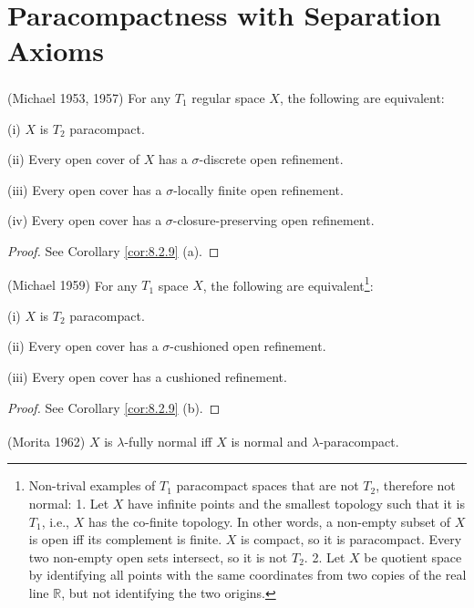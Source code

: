 \documentclass[ch2.tex]{subfiles}
\begin{document}
	\section{Paracompactness with Separation Axioms}  
	\label{sec:2.2}


 {\theorem{} \label{th:2.2.1}
\textup{(\hstretch{1.8}{[}Michael 1953, 1957\hstretch{1.8}{]}\textsuperscript{\cite{Michael1953}\cite{Michael1957}})}
For any $T_1$ regular space $X$, the following are equivalent:

\textup{(i)} $X$ is $T_2$ paracompact.

\textup{(ii)}  Every open cover of $X$ has a $\sigma$-discrete open refinement.

\textup{(iii)} Every open cover has a $\sigma$-locally finite open refinement.

\textup{(iv)}  Every open cover has a $\sigma$-closure-preserving open refinement.
}
\begin{proof}
See Corollary \ref{cor:8.2.9} (a).
\end{proof}

{\theorem{}  \label{th:2.2.2}
\textup{(\hstretch{1.8}{[}Michael 1959\hstretch{1.8}{]}\textsuperscript{\cite{Michael1959}})} 
For any $T_1$ space $X$, the following are equivalent\footnote{Non-trival examples of $T_1$ 
	paracompact spaces that are not $T_2$, therefore not normal:
	1. Let $X$ have infinite points and the smallest topology such that it is $T_1$, i.e., $X$ has the
	co-finite topology. In other words, a non-empty subset of $X$
	is open iff its complement is finite. $X$ is compact, so it is paracompact. Every two non-empty open sets intersect, so it is not $T_2$. 
	2. Let $X$ be quotient space 
	by identifying all points with the same coordinates from two copies of the real line $\mathbb{R}$, 
	but not identifying the two origins.}:

\textup{(i)}  $X$ is $T_2$ paracompact.

\textup{(ii)}  Every open cover has a $\sigma$-cushioned open refinement.

\textup{(iii)}  Every open cover has a cushioned refinement.
}

\begin{proof}
See Corollary \ref{cor:8.2.9} (b).
\end{proof}


{\theorem{}  \label{th:2.2.3}
\textup{(\hstretch{1.8}{[}Morita 1962\hstretch{1.8}{]}\textsuperscript{\cite{Morita1962}})} 
	$X$ is $\lambda$-fully normal iff $X$ is normal and $\lambda$-paracompact.
}
\end{document}
